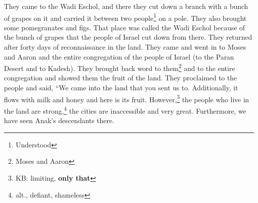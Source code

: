 \begin{enumerate*}[mode=unboxed]
     They came to the Wadi Eschol, and there they cut down a branch with a bunch of grapes on it and carried it between two people\footnote{Understood} on a pole. They also brought some pomegranates and figs.%
     That place was called the Wadi Eschol because of the bunch of grapes that the people of Israel cut down from there.%
     They returned after forty days of reconnaissance in the land.%
     They came and went in to Moses and Aaron and the entire congregation of the people of Israel (to the Paran Desert and to Kadesh). They brought back word to them\footnote{Moses and Aaron} and to the entire congregation and showed them the fruit of the land.%
     They proclaimed to the people and said, ``We came into the land that you sent us to. Additionally, it flows with milk and honey and here is its fruit.%
     However,\footnote{KB: limiting, \textbf{only that}} the people who live in the land are strong,\footnote{alt., defiant, shameless} the cities are inaccessible and very great. Furthermore, we have seen Anak's descendants there.%
\end{enumerate*}
